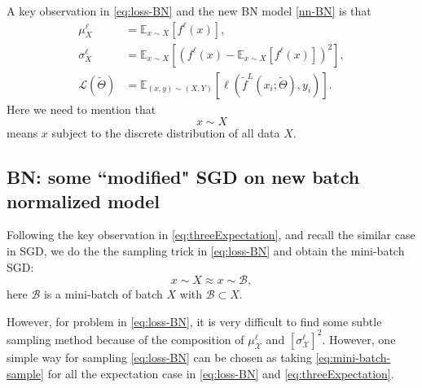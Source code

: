 A key observation in \eqref{eq:loss-BN} and the new BN model \eqref{nn-BN} is that
\begin{equation}\label{eq:threeExpectation}
\begin{aligned}
\mu^\ell_{ X} 
&= \mathbb{E}_{x \sim X} [f^\ell(x)],\\
\sigma^\ell_{ X}
&=  \mathbb{E}_{x \sim X}  \left[(f^\ell(x)-\mathbb{E}_{x \sim X}[ f^\ell(x)])^2 \right], \\
\mathcal L(\tilde \Theta) 
&=  \mathbb{E}_{(x,y)\sim (X,Y)}  \left[\ell(\tilde f^L(x_i; \tilde \Theta), y_i) \right].
\end{aligned}
\end{equation}
Here we need to mention that
$$
x \sim X
$$
means $x$ subject to the discrete distribution of all data $X$. 



\subsection{BN: some ``modified" SGD on new batch normalized model}
Following the key observation in \eqref{eq:threeExpectation}, and recall the 
similar case in SGD, we do the the sampling trick in \eqref{eq:loss-BN} and
obtain the mini-batch SGD:
\begin{equation}\label{eq:mini-batch-sample}
x \sim X \approx x \sim \mathcal B,
\end{equation}
here $\mathcal B$ is a mini-batch of batch $X$ with $\mathcal B \subset X$.

However, for problem in \eqref{eq:loss-BN}, it is very difficult to find some 
subtle sampling method because of the composition of $\mu^\ell_{\mathcal X}$
and $[\sigma^\ell_{\mathcal X}]^2 $. However, one simple way for sampling 
\eqref{eq:loss-BN} can be chosen as taking \eqref{eq:mini-batch-sample} for
all the expectation case in \eqref{eq:loss-BN} and \eqref{eq:threeExpectation}.

